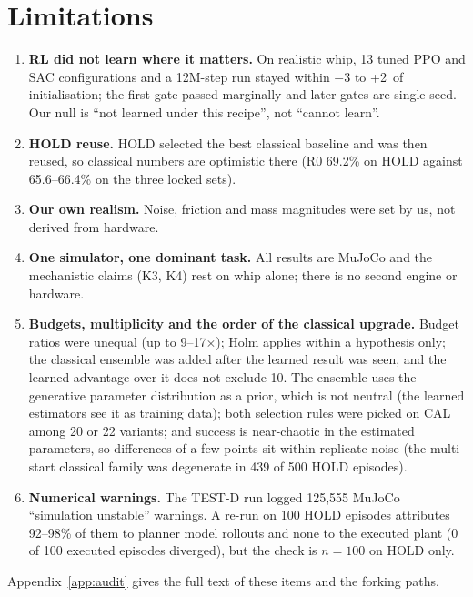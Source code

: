 \section{Limitations}
\label{sec:limitations}

\begin{enumerate}
\item \textbf{RL did not learn where it matters.} On realistic whip, 13 tuned PPO and SAC configurations and a 12M-step run stayed within $-3$ to +2\pp\ of initialisation; the first gate passed marginally and later gates are single-seed. Our null is ``not learned under this recipe'', not ``cannot learn''.
\item \textbf{HOLD reuse.} HOLD selected the best classical baseline and was then reused, so classical numbers are optimistic there (R0 69.2\% on HOLD against 65.6--66.4\% on the three locked sets).
\item \textbf{Our own realism.} Noise, friction and mass magnitudes were set by us, not derived from hardware.
\item \textbf{One simulator, one dominant task.} All results are MuJoCo and the mechanistic claims (K3, K4) rest on whip alone; there is no second engine or hardware.
\item \textbf{Budgets, multiplicity and the order of the classical upgrade.} Budget ratios were unequal (up to 9--17$\times$); Holm applies within a hypothesis only; the classical ensemble was added after the learned result was seen, and the learned advantage over it does not exclude 10\pp. The ensemble uses the generative parameter distribution as a prior, which is not neutral (the learned estimators see it as training data); both selection rules were picked on CAL among 20 or 22 variants; and success is near-chaotic in the estimated parameters, so differences of a few points sit within replicate noise (the multi-start classical family was degenerate in 439 of 500 HOLD episodes).
\item \textbf{Numerical warnings.} The TEST-D run logged 125{,}555 MuJoCo ``simulation unstable'' warnings. A re-run on 100 HOLD episodes attributes 92--98\% of them to planner model rollouts and none to the executed plant (0 of 100 executed episodes diverged), but the check is $n{=}100$ on HOLD only.
\end{enumerate}
Appendix~\ref{app:audit} gives the full text of these items and the forking paths.
